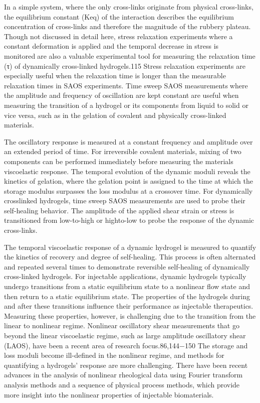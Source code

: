 \documentclass[../../main-notes.tex]{subfiles}
\begin{document}
In a simple system, where the only cross-links originate from physical cross-links, the equilibrium constant (Keq) of the interaction describes the equilibrium concentration of cross-links and therefore the magnitude of the rubbery plateau. 
Though not discussed in detail here, stress relaxation experimentswhere a constant deformation is applied and the temporal decrease in stress is monitoredare also a valuable experimental tool for measuring the relaxation time (τ) of dynamically cross-linked  hydrogels.115 
Stress relaxation experiments are especially useful when the relaxation time is longer than the measurable relaxation times in SAOS experiments. 
Time sweep SAOS measurementswhere the amplitude and frequency of oscillation are kept constantare useful when measuring the transition of a hydrogel or its components from liquid to solid or vice versa, such as in the gelation of covalent and physically cross-linked materials. 

The oscillatory response is measured at a constant frequency and amplitude over an extended period of time. 
For irreversible covalent materials, mixing of two components can be performed immediately before measuring the materials viscoelastic response. 
The temporal evolution of the dynamic moduli reveals the kinetics of gelation, where the gelation point is assigned to the time at which the storage modulus surpasses the loss modulus at a crossover time. 
For dynamically crosslinked hydrogels, time sweep SAOS measurements are used to probe their self-healing behavior. 
The amplitude of the applied shear strain or stress is transitioned from low-to-high or highto-low to probe the response of the dynamic cross-links. 

The temporal viscoelastic response of a dynamic hydrogel is measured to quantify the kinetics of recovery and degree of self-healing. 
This process is often alternated and repeated several times to demonstrate reversible self-healing of dynamically cross-linked hydrogels. 
For injectable applications, dynamic hydrogels typically undergo transitions from a static equilibrium state to a nonlinear flow state and then return to a static equilibrium state. 
The properties of the hydrogels during and after these transitions influence their performance as injectable therapeutics. 
Measuring these properties, however, is challenging due to the transition from the linear to nonlinear regime. 
Nonlinear oscillatory shear measurements that go beyond the linear viscoelastic regime, such as large amplitude oscillatory shear  (LAOS), have been a recent area of research focus.86,144−150 
The storage and loss moduli become ill-defined in the nonlinear regime, and methods for quantifying a hydrogels’ response are more challenging. 
There have been recent advances in the analysis of nonlinear rheological data using Fourier transform analysis methods and a sequence of physical process methods, which provide more insight into the nonlinear properties of injectable biomaterials.
\end{document}
